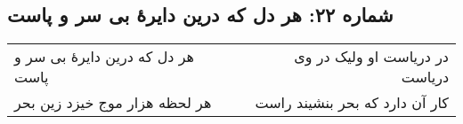 \begin{center}
\section*{شماره ۲۲: هر دل که درین دایرۀ بی سر و پاست}
\label{sec:022}
\begin{longtable}{l p{0.5cm} r}
هر دل که درین دایرهٔ بی سر و پاست
&&
در دریاست او ولیک در وی دریاست
\\
هر لحظه هزار موج خیزد زین بحر
&&
کار آن دارد که بحر بنشیند راست
\\
\end{longtable}
\end{center}
